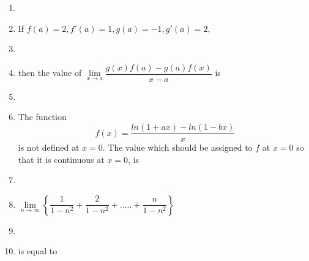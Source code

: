 \begin{enumerate}[label=\arabic*.,ref=\thesubsection.\theenumi]
\item[~] \item If $f(a)\mathbin{=}2, f'(a)\mathbin{=}1, g(a)\mathbin{=}-1, g'(a)\mathbin{=}2$, \item[~]\item[~] then the value of $\lim\limits_{x \to a}\dfrac{g(x)f(a)-g(a)f(x)}{x-a}$ is
\begin{itemize}
\end{itemize}

\item[~] \item The function \[f(x)=\dfrac{ln(1+ax)-ln(1-bx)}{x}\] is not defined at $x\mathbin{=}0$. The value which should be assigned to $f$ at $x=0$ so that it is continuous at $x\mathbin{=}0$, is
\begin{itemize}
\end{itemize}

\item[~] \item$\lim\limits_{n \to \infty}\left\{\dfrac{1}{1-n^2}+\dfrac{2}{1-n^2}+.....+\dfrac{n}{1-n^2}\right\}$ \item[~] \item[~]is equal to
\begin{itemize}
\end{itemize}


\end{enumerate}

